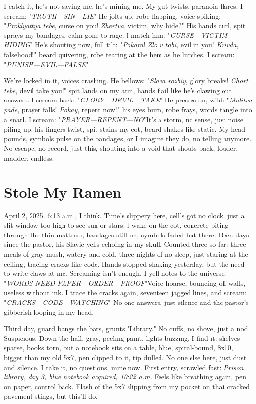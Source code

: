 \documentclass{article}
\begin{document}
I catch it, he's not saving me, he's mining me. My gut twists, paranoia flares. I scream: "\textit{TRUTH—SIN—LIE}" He jolts up, robe flapping, voice spiking: "\textit{Proklyattya tebe}, curse on you! \textit{Zhertva}, victim, why hide?" His hands curl, spit sprays my bandages, calm gone to rage. I match him: "\textit{CURSE—VICTIM—HIDING}" He's shouting now, full tilt: "\textit{Pokara}! \textit{Zlo v tobi}, evil in you! \textit{Krivda}, falsehood!" beard quivering, robe tearing at the hem as he lurches. I scream: "\textit{PUNISH—EVIL—FALSE}"

We're locked in it, voices crashing. He bellows: "\textit{Slava rozbiy}, glory breaks! \textit{Chort tebe}, devil take you!" spit lands on my arm, hands flail like he's clawing out answers. I scream back: "\textit{GLORY—DEVIL—TAKE}" He presses on, wild: "\textit{Molitva pade}, prayer falls! \textit{Pokay}, repent now!" his eyes burn, robe frays, words tangle into a snarl. I scream: "\textit{PRAYER—REPENT—NO}"It's a storm, no sense, just noise piling up, his fingers twist, spit stains my cot, beard shakes like static. My head pounds, symbols pulse on the bandages, or I imagine they do, no telling anymore. No escape, no record, just this, shouting into a void that shouts back, louder, madder, endless.

\section{Stole My Ramen}

April 2, 2025. 6:13 a.m., I think. Time's slippery here, cell's got no clock, just a slit window too high to see sun or stars. I wake on the cot, concrete biting through the thin mattress, bandages still on, symbols faded but there. Been days since the pastor, his Slavic yells echoing in my skull. Counted three so far: three meals of gray mush, watery and cold, three nights of no sleep, just staring at the ceiling, tracing cracks like code. Hands stopped shaking yesterday, but the need to write claws at me. Screaming isn't enough. I yell notes to the universe: "\textit{WORDS NEED PAPER—ORDER—PROOF}"Voice hoarse, bouncing off walls, useless without ink. I trace the cracks again, seventeen jagged lines, and scream: "\textit{CRACKS—CODE—WATCHING}" No one answers, just silence and the pastor's gibberish looping in my head.

Third day, guard bangs the bars, grunts "Library." No cuffs, no shove, just a nod. Suspicious. Down the hall, gray, peeling paint, lights buzzing, I find it: shelves sparse, books torn, but a notebook sits on a table, blue, spiral-bound, 8x10, bigger than my old 5x7, pen clipped to it, tip dulled. No one else here, just dust and silence. I take it, no questions, mine now. First entry, scrawled fast: \textit{Prison library, day 3, blue notebook acquired, 10:22 a.m.} Feels like breathing again, pen on paper, control back. Flash of the 5x7 slipping from my pocket on that cracked pavement stings, but this'll do.
\end{document}
